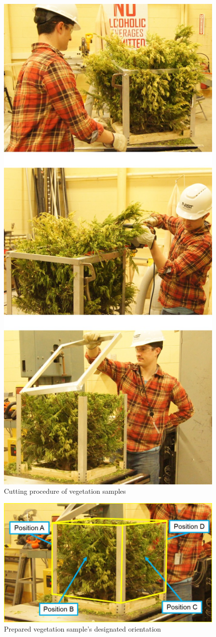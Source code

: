 \documentclass[12pt]{article}
\begin{document}
\begin{figure} [!]
	\centering
	\includegraphics[height=8.in,keepaspectratio]{Picture2.jpg}
	\caption{Cutting procedure of vegetation samples}
	\label{fig:Sampleprep}
\end{figure}
\begin{figure} [!]
	\centering 	\includegraphics[width=1.0\linewidth]{Picture3.jpg}
	\caption{Prepared vegetation sample's designated orientation}
	\label{fig:Vegpos}
\end{figure}
\end{document}

